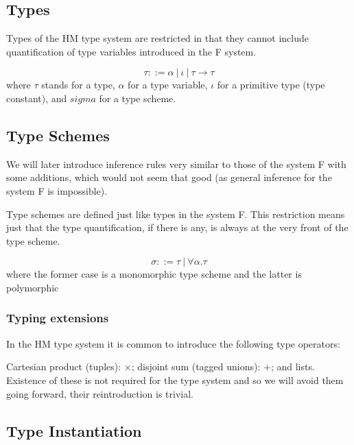 \subsection{Types}

Types of the HM type system are restricted in that they cannot include quantification of type variables introduced in the F system.

\begin{defn}[Type]
    $$\tau ::= \alpha\ |\ \iota\ |\ \tau \rightarrow \tau$$
    where $\tau$ stands for a type, $\alpha$ for a type variable, $\iota$ for a primitive type (type constant), and $sigma$ for a type scheme. %
\end{defn}

\subsection{Type Schemes}

We will later introduce inference rules very similar to those of the system F with some additions, which would not seem that good (as general inference for the system F is impossible). %

Type schemes are defined just like types in the system F. This restriction means just that the type quantification, if there is any, is always at the very front of the type scheme.

\begin{defn}
    $$\sigma ::= \tau\ |\ \forall \alpha . \tau$$
    where the former case is a monomorphic type scheme and the latter is polymorphic
\end{defn}

\subsubsection{Typing extensions}

In the HM type system it is common to introduce the following type operators:

Cartesian product (tuples): $\times$; disjoint sum (tagged unions): $+$; and lists. Existence of these is not required for the type system and so we will avoid them going forward, their reintroduction is trivial.

\subsection{Type Instantiation}

